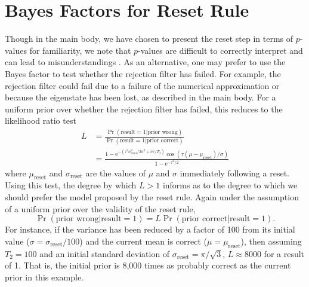 \documentclass[aps,pra,amsmath,twocolumn,amssymb,superscriptaddress]{revtex4-1}
\newcommand{\reset}{\mathrm{reset}}
\newcommand{\ee}{\mathrm{e}}
\begin{document}
{%
\section{Bayes Factors for Reset Rule}
\label{app:bf}

Though in the main body, we have chosen to present the reset step in terms of
$p$-values for familiarity, we note that $p$-values are difficult to correctly
interpret and can lead to misunderstandings \cite{goodman_dirty_2008,hoekstra_robust_2014}. As an
alternative, one may prefer to use the Bayes factor to test whether the rejection
filter has failed. For example, the rejection filter could fail due to
a failure of the numerical approximation or because the eigenstate has
been lost, as described in the main body. For a uniform prior over
whether the rejection filter has failed, this reduces to the likelihood
ratio test
\begin{subequations}
    \begin{align}
        L & = \frac{\Pr(\text{result} = 1 | \text{prior wrong})}{\Pr(\text{result} = 1 | \text{prior correct})} \\
          & = \frac{                  
                  1 - \ee^{
                          - (\tau^2 \sigma_\reset^2 / 2 \sigma^2 + \sigma \tau / T_2)
                      }
                      \cos \left(
                        \tau \left(\mu -\mu _\reset \right) / \sigma
                      \right)
              }{
                  1-\ee^{-\tau^2 / 2}
              }
    \end{align}
\end{subequations}
where $\mu_\reset$ and $\sigma_\reset$ are the values of $\mu$ and $\sigma$
immediately following a reset. Using this test, the degree by which $L > 1$
informs as to the degree to which we should prefer the model proposed by the
reset rule. Again under the assumption of a uniform prior over the
validity of the reset rule,
\begin{equation}
    \Pr(\text{prior wrong} | \text{result} = 1) = L \Pr(\text{prior correct} | \text{result} = 1).
\end{equation}
For instance, if the variance has been reduced by a factor of 100 from
its initial value ($\sigma = \sigma_\reset / 100$) and the current mean is
correct ($\mu = \mu_\reset$), then assuming $T_2 = 100$ and an initial standard
deviation of $\sigma_\reset = \pi / \sqrt{3}$, $L\approx8000$ for a result of
1. That is, the initial prior is 8,000 times as probably correct as the current
prior in this example.

}
\end{document}
